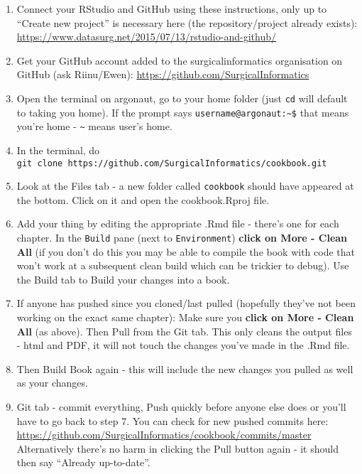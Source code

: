 \documentclass[]{book}
\theoremstyle{definition}
\theoremstyle{definition}
\theoremstyle{definition}
\theoremstyle{remark}
\begin{document}
\begin{enumerate}
\def\labelenumi{\arabic{enumi}.}
\item
  Connect your RStudio and GitHub using these instructions, only up to
  ``Create new project'' is necessary here (the repository/project
  already exists):
  \url{https://www.datasurg.net/2015/07/13/rstudio-and-github/}
\item
  Get your GitHub account added to the surgicalinformatics organisation
  on GitHub (ask Riinu/Ewen):
  \url{https://github.com/SurgicalInformatics}
\item
  Open the terminal on argonaut, go to your home folder (just
  \texttt{cd} will default to taking you home). If the prompt says
  \texttt{username@argonaut:\textasciitilde{}\$} that means you're home
  - \texttt{\textasciitilde{}} means user's home.
\item
  In the terminal, do
  \texttt{git\ clone\ https://github.com/SurgicalInformatics/cookbook.git}
\item
  Look at the Files tab - a new folder called \texttt{cookbook} should
  have appeared at the bottom. Click on it and open the cookbook.Rproj
  file.
\item
  Add your thing by editing the appropriate .Rmd file - there's one for
  each chapter. In the \texttt{Build} pane (next to
  \texttt{Environment}) \textbf{click on More - Clean All} (if you don't
  do this you may be able to compile the book with code that won't work
  at a subsequent clean build which can be trickier to debug). Use the
  Build tab to Build your changes into a book.
\item
  If anyone has pushed since you cloned/last pulled (hopefully they've
  not been working on the exact same chapter): Make sure you
  \textbf{click on More - Clean All} (as above). Then Pull from the Git
  tab. This only cleans the output files - html and PDF, it will not
  touch the changes you've made in the .Rmd file.
\item
  Then Build Book again - this will include the new changes you pulled
  as well as your changes.
\item
  Git tab - commit everything, Push quickly before anyone else does or
  you'll have to go back to step 7. You can check for new pushed commits
  here:
  \url{https://github.com/SurgicalInformatics/cookbook/commits/master}
  Alternatively there's no harm in clicking the Pull button again - it
  should then say ``Already up-to-date''.
\end{enumerate}
\end{document}
